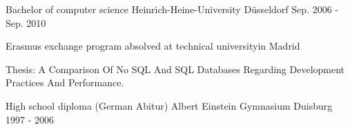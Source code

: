

\begin{cventries}

  \cventry
    {Bachelor of computer science} %
    {Heinrich-Heine-University} %
    {Düsseldorf} %
    {Sep. 2006 - Sep. 2010} %
    {
      \begin{cvitems} %
        \item {Erasmus exchange program absolved at technical universityin Madrid}
        \item { Thesis: A Comparison Of No SQL And SQL Databases Regarding Development Practices And Performance. }
      \end{cvitems}
    }

  \cventry
    {High school diploma (German Abitur)} %
    {Albert Einstein Gymnasium} %
    {Duisburg} %
    {1997 - 2006} %
    {}

\end{cventries}
